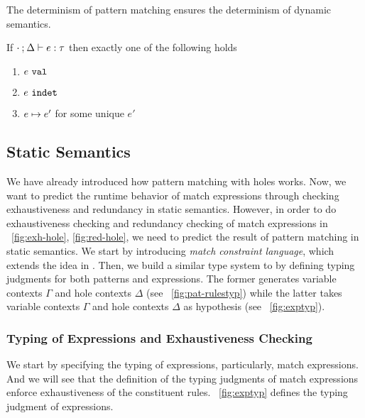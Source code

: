 \documentclass[runningheads,envcountsame,a4paper]{llncs}
\begin{document}
The determinism of pattern matching ensures the determinism of dynamic semantics.

\begin{theorem}[Determinism]
  \label{thrm:determinism}
  If $\cdot \mathbin{;} \Delta \vdash e : \tau$ then exactly one of the following holds
  \begin{enumerate}
    \item $e ~\mathtt{val}$
    \item $e ~\mathtt{indet}$
    \item $e \mapsto e'$ for some unique $e'$
  \end{enumerate}
\end{theorem}

\subsection{Static Semantics}\label{sec:statics}

We have already introduced how pattern matching with holes works. Now, we want
to predict the runtime behavior of match expressions through checking
exhaustiveness and redundancy in static semantics. However, in order to do exhaustiveness checking and redundancy
checking of match expressions in \listfigurename~\ref{fig:exh-hole},
\ref{fig:red-hole}, we need to predict the result of pattern matching in static
semantics. We start by introducing \textit{match constraint language}, which
extends the idea in \cite{Harper2012}. Then, we build a similar type system to
\cite{DBLP:journals/pacmpl/OmarVCH19} by defining typing judgments for both
patterns and expressions. The former generates variable contexts $\Gamma$ and
hole contexts $\Delta$ (see \figurename~\ref{fig:pat-rulestyp}) while the latter 
takes variable contexts $\Gamma$ and hole contexts $\Delta$ as hypothesis (see
\figurename~\ref{fig:exptyp}).

\subsubsection{Typing of Expressions and Exhaustiveness Checking} \label{sec:exptyp}

We start by specifying the typing of expressions, particularly, match
expressions. And we will see that the definition of the typing judgments of
match expressions enforce exhaustiveness of the constituent rules.
\figurename~\ref{fig:exptyp} defines the typing judgment of expressions.


\end{document}
